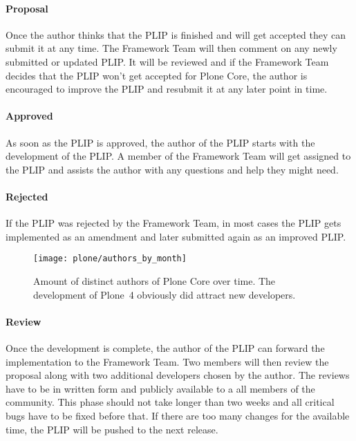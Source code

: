 \paragraph{Proposal}

Once the author thinks that the \ac{PLIP} is finished and will get accepted
they can submit it at any time. The Framework Team will then comment on any
newly submitted or updated \ac{PLIP}. It will be reviewed and if the Framework
Team decides that the \ac{PLIP} won't get accepted for Plone Core, the author
is encouraged to improve the \ac{PLIP} and resubmit it at any later point in
time.

\paragraph{Approved}

As soon as the \ac{PLIP} is approved, the author of the \ac{PLIP} starts with
the development of the \ac{PLIP}. A member of the Framework Team will get
assigned to the \ac{PLIP} and assists the author with any questions and help
they might need.

\paragraph{Rejected}

If the \ac{PLIP} was rejected by the Framework Team, in most cases the
\ac{PLIP} gets implemented as an amendment and later submitted again as an
improved \ac{PLIP}.

\begin{figure}[hbtp]
  \centering
  \texttt{[image: plone/authors\_by\_month]}
  \caption[Authors by month, Plone]
  {Amount of distinct authors of Plone Core over time. The development of
    Plone~4 obviously did attract new developers.}
\end{figure}

\paragraph{Review}

Once the development is complete, the author of the \ac{PLIP} can forward the
implementation to the Framework Team. Two members will then review the proposal
along with two additional developers chosen by the author. The reviews have to
be in written form and publicly available to a all members of the community.
This phase should not take longer than two weeks and all critical bugs have to
be fixed before that. If there are too many changes for the available time, the
\ac{PLIP} will be pushed to the next release.

